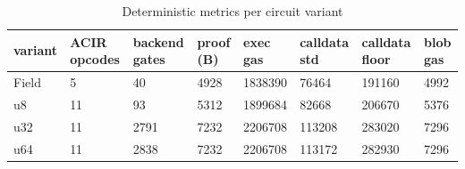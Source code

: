 \begin{table}[htbp]
\centering
\caption{Deterministic metrics per circuit variant}
\label{tab:deterministic}
\begin{tabular}{llllllll}
\toprule
variant & ACIR opcodes & backend gates & proof (B) & exec gas & calldata std & calldata floor & blob gas \\
\midrule
Field & 5 & 40 & 4928 & 1838390 & 76464 & 191160 & 4992 \\
u8 & 11 & 93 & 5312 & 1899684 & 82668 & 206670 & 5376 \\
u32 & 11 & 2791 & 7232 & 2206708 & 113208 & 283020 & 7296 \\
u64 & 11 & 2838 & 7232 & 2206708 & 113172 & 282930 & 7296 \\
\bottomrule
\end{tabular}
\end{table}
